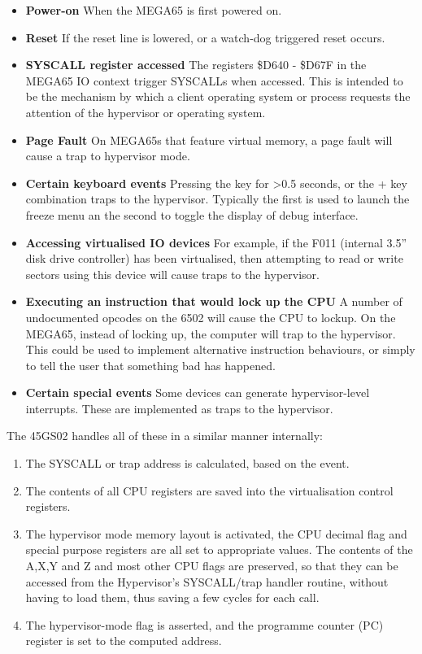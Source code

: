 \begin{itemize}
\item{\bf Power-on} When the MEGA65 is first powered on.
\item{\bf Reset} If the reset line is lowered, or a watch-dog triggered reset occurs.
\item{\bf SYSCALL register accessed} The registers \$D640 - \$D67F in the MEGA65 IO context trigger SYSCALLs when accessed.
  This is intended to be the mechanism by which a client operating system or process requests the attention of the hypervisor or operating system.
\item{\bf Page Fault} On MEGA65s that feature virtual memory, a page fault will cause a trap to hypervisor mode.
\item{\bf Certain keyboard events} Pressing the  key for >0.5 seconds, or the  +  key combination traps to the hypervisor.  Typically the first is used to launch the freeze menu an the second to toggle the display of debug interface.
\item{\bf Accessing virtualised IO devices} For example, if the F011 (internal 3.5'' disk drive controller) has been virtualised, then attempting to read or write sectors using this device will cause traps to the hypervisor.
  \item{\bf Executing an instruction that would lock up the CPU} A number of undocumented opcodes on the 6502 will cause the CPU to lockup.  On the MEGA65, instead of locking up, the computer will trap to the hypervisor.  This could be used to implement alternative instruction behaviours, or simply to tell the user that something bad has happened.
  \item{\bf Certain special events} Some devices can generate hypervisor-level interrupts. These are implemented as traps to the hypervisor.
\end{itemize}

The 45GS02 handles all of these in a similar manner internally:

\begin{enumerate}
\item The SYSCALL or trap address is calculated, based on the event.
\item The contents of all CPU registers are saved into the virtualisation control registers.
\item The hypervisor mode memory layout is activated, the CPU decimal flag and special purpose registers are all set to appropriate values.  The contents of the A,X,Y and Z and most other CPU flags are preserved, so that they can be accessed from the Hypervisor's SYSCALL/trap handler routine, without having to load them, thus saving a few cycles for each call.
\item The hypervisor-mode flag is asserted, and the programme counter (PC) register is set to the computed address.
\end{enumerate}

